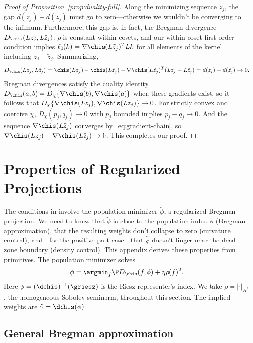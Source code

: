 \documentclass{article}
\begin{document}
\begin{proof}[Proof of
Proposition~\ref{prop:duality-full}]
Along the minimizing sequence $z_j$, the gap $d(z_j) - d(\tilde z_j)$ must go to zero---otherwise we wouldn't be converging to the infimum. Furthermore, this gap is, in fact, the Bregman divergence $D_{\chis}(Lz_j, L\tilde z_j)$: $\rho$ is constant within cosets, and our within-coset first order condition implies $\ell_0(k) = \nabla\chis(L\tilde z_j)^T L k$ for all elements of the kernel including $z_j - \tilde z_j$. Summarizing,
\[
D_{\chis}(Lz_j, L\tilde z_j) = \chis(Lz_j) - \chis(L\tilde z_j) - \nabla\chis(L\tilde z_j)^T(Lz_j - L\tilde z_j) = d(z_j) - d(\tilde z_j) \to 0.
\]
Bregman divergences satisfy the duality identity $D_{\chis}(a,b) = D_{\chi}\{\nabla\chis(b), \nabla\chis(a)\}$ when these gradients exist, so it follows that $D_{\chi}\{\nabla\chis(L\tilde z_j), \nabla\chis(Lz_j)\} \to 0$. For strictly convex and coercive $\chi$, $D_{\chi}(p_j, q_j) \to 0$ with $p_j$ bounded implies $p_j - q_j \to 0$. And the sequence $\nabla\chis(L\tilde z_j)$ converges by~\eqref{eq:gradient-chain}, so $\nabla\chis(Lz_j) - \nabla\chis(L\tilde z_j) \to 0$. This completes our proof.
\end{proof}



\section{Properties of Regularized Projections}
\label{sec:regularized-projections}
The conditions in  involve the population minimizer $\tilde\phi$, a regularized Bregman projection. We need to know that $\tilde\phi$ is close to the population index $\phi$ (Bregman approximation), that the resulting weights don't collapse to zero (curvature control), and---for the positive-part case---that $\tilde\phi$ doesn't linger near the dead zone boundary (density control). This appendix derives these properties from primitives.
The population minimizer solves
\[
\tilde\phi = \argmin_f \P D_{\chis}(f, \phi) + \eta \rho(f)^2.
\]
Here $\phi = (\dchis)^{-1}(\griesz)$ is the Riesz representer's index. We take $\rho = |\cdot|_{\dot H^s}$, the homogeneous Sobolev seminorm, throughout this section. The implied weights are $\tilde\gamma = \dchis(\tilde\phi)$.

\subsection{General Bregman approximation}
\end{document}
